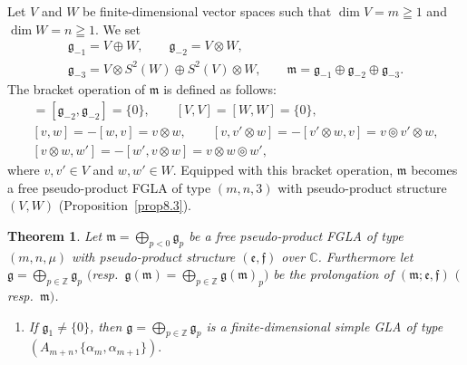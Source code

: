 \documentclass[11pt]{article}
\newtheorem{theorem}{Theorem}
\numberwithin{equation}{section}
\numberwithin{theorem}{section}
\numberwithin{proposition}{section}
\numberwithin{lemma}{section}
\numberwithin{corollary}{section}
\numberwithin{definition}{section}
\numberwithin{example}{section}
\numberwithin{remark}{section}
\numberwithin{note}{section}
\newcommand{\gla}[1]{\mathfrak#1=\bigoplus\limits_{p\in\mathbb Z}\mathfrak#1_p} \renewcommand{\labelenumi}{{\rm (\arabic{enumi})}}
\newcounter{theoremI}
\begin{document}
\begin{example}
Let $V$ and $W$ be f\/inite-dimensional vector spaces
such that $\dim V=m\geqq1$ and $\dim W=n\geqq1$.
We set
\begin{gather*}
\mathfrak g_{-1}  =V\oplus W, \qquad \mathfrak g_{-2}=V\otimes W, \\
\mathfrak g_{-3}  = V\otimes S^2(W)\oplus S^2(V)\otimes W,
\qquad \mathfrak m=\mathfrak g_{-1}\oplus \mathfrak g_{-2}\oplus
\mathfrak g_{-3}.
\end{gather*}
The bracket operation of $\mathfrak m$ is def\/ined as follows:
 \begin{gather*}
  [\mathfrak g_{-3},\mathfrak g_{-1}\oplus \mathfrak g_{-2}]
=[\mathfrak g_{-2},\mathfrak g_{-2}]=\{0\},  \qquad [V,V]=[W,W]=\{0\},\\
[v,w]=-[w,v]=v\otimes w, \qquad
  [v,v'\otimes w]=-[v'\otimes w,v]=v\circledcirc v'\otimes w,
\\ [v\otimes w,w']=-[w',v\otimes w]=v\otimes w\circledcirc w',
\end{gather*}
where $v,v'\in V$ and $w,w'\in W$.
Equipped with this bracket operation, $\mathfrak m$ becomes
a free pseudo-product FGLA of type $(m,n,3)$ with pseudo-product structure
$(V,W)$ (Proposition~\ref{prop8.3}).
\end{example}
\setcounter{section}{8}
\setcounter{subsection}{0}
\setcounter{subsubsection}{0}
\setcounter{theoremI}{2}
\setcounter{equation}{0}
\begin{theorem}\label{thm8.1}
Let $\mathfrak m=\bigoplus\limits_{p<0}\mathfrak g_p$ be a free
pseudo-product FGLA of type $(m,n,\mu)$ with
pseudo-product structure $(\mathfrak e,\mathfrak f)$ over $\mathbb C$.
Furthermore let
$\gla g$
$($resp.\
$\mathfrak g(\mathfrak m)
=\bigoplus\limits_{p\in\mathbb Z}\mathfrak g(\mathfrak m)_p)$
be the prolongation of $(\mathfrak m;\mathfrak e,\mathfrak f)$
$($resp.~$\mathfrak m)$.
\begin{enumerate}\itemsep=0pt
\setcounter{enumi}{1}
\item
If $\mathfrak g_{1}\!\ne\!\{0\}$, then $\gla g$
is a finite-dimensional simple GLA of type
$(A_{m{+}n},\{\alpha_m,\alpha_{m{+}1}\}).\!$
\end{enumerate}
\end{theorem}
\setcounter{section}{8}
\setcounter{subsection}{0}
\setcounter{subsubsection}{0}
\setcounter{theoremI}{2}
\setcounter{equation}{0}
\end{document}
